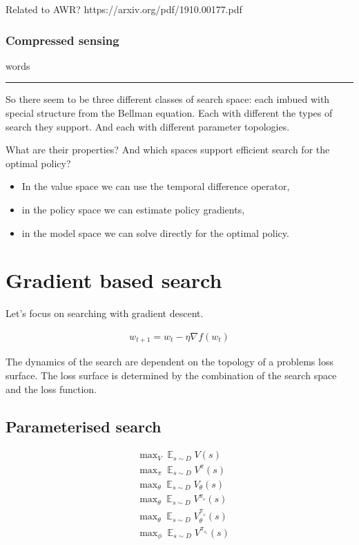 Related to AWR? https://arxiv.org/pdf/1910.00177.pdf

\subsubsection{Compressed sensing}

words



\begin{center}\rule{0.5\linewidth}{\linethickness}\end{center}

So there seem to be three different classes of search space: each imbued with special
structure from the Bellman equation. Each with different the types of search they
support. And each with different parameter topologies.

What are their properties? And which spaces support efficient search for the optimal policy?

\begin{itemize}
\tightlist
\item
  In the value space we can use the temporal difference operator,
\item
  in the policy space we can estimate policy gradients,
\item
  in the model space we can solve directly for the optimal policy.
\end{itemize}

\section{Gradient based search}

Let's focus on searching with gradient descent.

\begin{align}
w_{t+1} = w_t - \eta \nabla f(w_t)
\end{align}

The dynamics of the search are dependent on the topology of a problems loss surface.
The loss surface is determined by the combination of the search space and the loss function.

\subsection{Parameterised search}

\begin{align}
&\mathop{\text{max}}_V \mathop{\mathbb E}_{s\sim D} V(s) \\
&\mathop{\text{max}}_{\pi} \mathop{\mathbb E}_{s\sim D}V^{\pi}(s) \\
&\mathop{\text{max}}_{\theta} \mathop{\mathbb E}_{s\sim D} V_{\theta}(s)\label{eq:deepQ}\\
&\mathop{\text{max}}_{\theta} \mathop{\mathbb E}_{s\sim D} V^{\pi_{_{\theta}}}(s) \\
&\mathop{\text{max}}_{\theta} \mathop{\mathbb E}_{s\sim D} V_{\theta}^{\pi_{_{\phi}}}(s)\label{eq:actorcritic} \\
&\mathop{\text{max}}_{\phi} \mathop{\mathbb E}_{s\sim D} V^{\pi_{_{\theta_{\phi}}}}(s)
\end{align}

